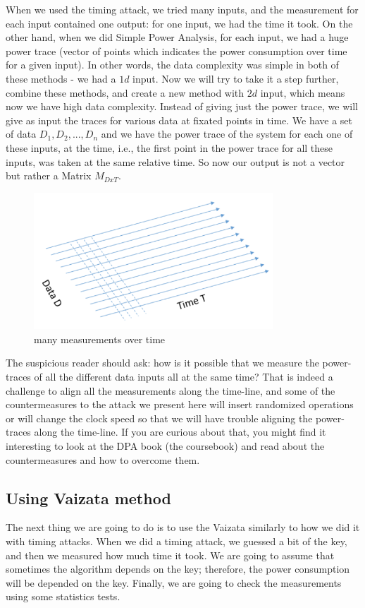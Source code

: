 When we used the timing attack, we tried many inputs, and the measurement for each input contained one output: for one input, we had the time it took. 
On the other hand, when we did Simple Power Analysis, for each input, we had a huge power trace (vector of points which indicates the power consumption over time for a given input). 
In other words, the data complexity was simple in both of these
methods - we had a $1d$ input. 
Now we will try to take it a step further, combine these methods, and create a new method with $2d$ input, which means now we have high data complexity. 
Instead of giving just the power trace, we will give as input the traces for various data at fixated points in time. 
We have a set of data ${D_1, D_2, ..., D_n}$ and we have the power trace of the system for each one of these inputs, at the time, i.e., the first point in the power trace for all these inputs, was taken at the same relative time. 
So now our output is not a vector but rather a Matrix $M_{DxT}$.

\begin{figure}[!ht]
    \centering
    \includegraphics[width=0.8\textwidth]{images/Lecture6/DPA_Illustration.png}
    \caption{many measurements over time} \label{fig:DPA_Illustration}
\end{figure}

The suspicious reader should ask: how is it possible that we measure the power-traces of all the different data inputs all at the same time? 
That is indeed a challenge to align all the measurements along the time-line, and some of the countermeasures to the attack we present here will insert randomized operations or will change the clock speed so that we will have trouble aligning the power-traces along the time-line. 
If you are curious about that, you might find it interesting to look at the DPA book (the coursebook) and read about the countermeasures and how to overcome them.

\subsection{Using Vaizata method}
The next thing we are going to do is to use the Vaizata similarly to how we did it with timing attacks. 
When we did a timing attack, we guessed a bit of the key, and then we measured how much time it took. 
We are going to assume that sometimes the algorithm depends on the key; therefore, the power consumption will be depended on the key. 
Finally, we are going to check the measurements using some statistics tests. 

